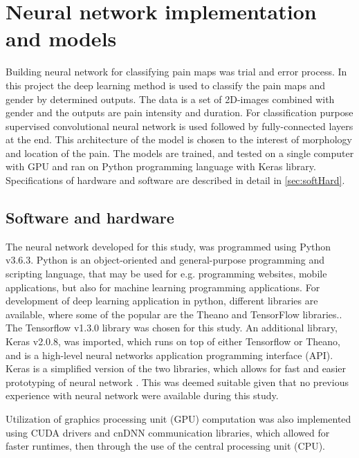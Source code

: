 \newpage
\section{Neural network implementation and models}
Building neural network for classifying pain maps was trial and error process.
In this project the deep learning method is used to classify the pain maps and gender by determined outputs. The data is a set of 2D-images combined with gender and the outputs are pain intensity and duration. For classification purpose supervised convolutional neural network is used followed by fully-connected layers at the end. This architecture of the model is chosen to the interest of morphology and location of the pain. The models are trained, and tested on a single computer with GPU and ran on Python programming language with Keras library. Specifications of hardware and software are described in detail in \autoref{sec:softHard}.

\subsection{Software and hardware}\label{sec:softHard}
The neural network developed for this study, was programmed using Python v3.6.3. Python is an object-oriented and general-purpose programming and scripting language, that may be used for e.g. programming websites, mobile applications, but also for machine learning programming applications.
For development of deep learning application in python, different libraries are available, where some of the popular are the Theano and TensorFlow libraries.\citep{Swamynathan2017}. The Tensorflow v1.3.0 library was chosen for this study. %
An additional library, Keras v2.0.8, was imported, which runs on top of either Tensorflow or Theano, and is a high-level neural networks application programming interface (API).   
Keras is a simplified version of the two libraries, which allows for fast and easier prototyping of neural network \citep{Chollet2015}. This was deemed suitable given that no previous experience with neural network were available during this study.  

Utilization of graphics processing unit (GPU) computation was also implemented using CUDA drivers and cnDNN communication libraries, which allowed for faster runtimes, then through the use of the central processing unit (CPU).
 
